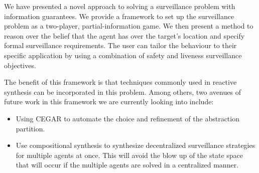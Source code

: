 We have presented a novel approach to solving a surveillance problem with information guarantees. We provide a framework to set up the surveillance problem as a two-player, partial-information game. We then present a method to reason over the belief that the agent has over the target's location and specify formal surveillance requirements. The user can tailor the behaviour to their specific application by using a combination of safety and liveness surveillance objectives.

The benefit of this framework is that techniques commonly used in reactive synthesis can be incorporated in this problem. Among others, two avenues of future work in this framework we are currently looking into include: 
\begin{itemize}
\item Using CEGAR to automate the choice and refinement of the abstraction partition.
\item Use compositional synthesis to synthesize decentralized surveillance strategies for multiple agents at once. This will avoid the blow up of the state space that will occur if the multiple agents are solved in a centralized manner.
\end{itemize}